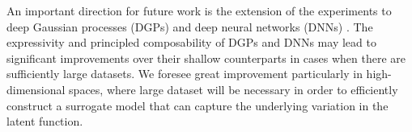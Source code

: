 \documentclass[conference]{IEEEtran}
\begin{document}
	An important direction for future work is the extension of the experiments to deep Gaussian processes (DGPs) and deep neural networks (DNNs) \cite{Damianou2013DeepProcesses}. The expressivity and principled composability of DGPs and DNNs may lead to significant improvements over their shallow counterparts in cases when there are sufficiently large datasets. We foresee great improvement particularly in high-dimensional spaces, where large dataset will be necessary in order to efficiently construct a surrogate model that can capture the underlying variation in the latent function.
	
	
	
	
	
	
\end{document}
